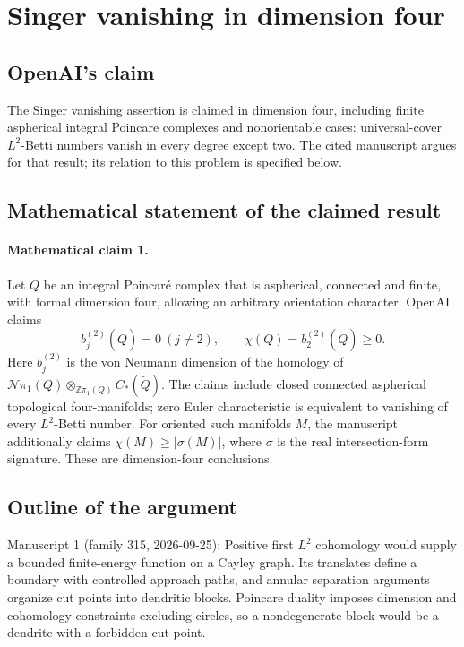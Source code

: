 \documentclass[11pt]{article}
\begin{document}
\section*{Singer vanishing in dimension four}

\subsection{OpenAI's claim}
The Singer vanishing assertion is claimed in dimension four, including finite aspherical integral Poincare complexes and nonorientable cases: universal-cover \(L^2\)-Betti numbers vanish in every degree except two. The cited manuscript argues for that result; its relation to this problem is specified below.

\subsection{Mathematical statement of the claimed result}
\paragraph{Mathematical claim 1.} Let $Q$ be an integral Poincaré complex that is aspherical, connected and finite, with formal dimension four, allowing an arbitrary orientation character. OpenAI claims
\[
b_j^{(2)}(\widetilde Q)=0\ (j\ne2),\qquad
\chi(Q)=b_2^{(2)}(\widetilde Q)\ge0.
\]
Here $b_j^{(2)}$ is the von Neumann dimension of the homology of $\mathcal N\pi_1(Q)\otimes_{\mathbb Z\pi_1(Q)}C_*(\widetilde Q)$. The claims include closed connected aspherical topological four-manifolds; zero Euler characteristic is equivalent to vanishing of every $L^2$-Betti number. For oriented such manifolds $M$, the manuscript additionally claims $\chi(M)\ge|\sigma(M)|$, where $\sigma$ is the real intersection-form signature. These are dimension-four conclusions.

\subsection{Outline of the argument}
Manuscript 1 (family 315, 2026-09-25): Positive first \(L^2\) cohomology would supply a bounded finite-energy function on a Cayley graph. Its translates define a boundary with controlled approach paths, and annular separation arguments organize cut points into dendritic blocks. Poincare duality imposes dimension and cohomology constraints excluding circles, so a nondegenerate block would be a dendrite with a forbidden cut point.
\end{document}
